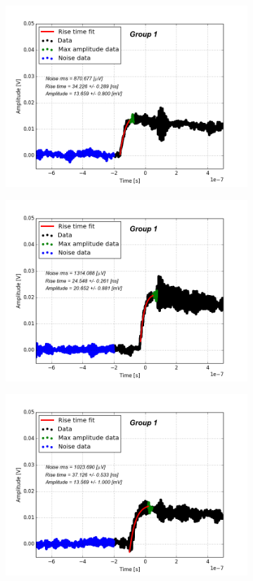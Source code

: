 \documentclass[12pt]{article}
\begin{document}
\begin{figure}[h!]
\begin{subfigure}[t]{0.45\textwidth}
    \includegraphics[width=1.1\textwidth]{./graphics/data_2.png}
  \end{subfigure}
  \hfill
  \begin{subfigure}[t]{0.45\textwidth}
    \centering
    \includegraphics[width=1.1\textwidth]{./graphics/data_3.png}
  \end{subfigure}
  \hfill
  \begin{subfigure}[t]{0.45\textwidth}
    \centering
    \includegraphics[width=1.1\textwidth]{./graphics/data_4.png}

\end{subfigure}
\end{figure}
\end{document}
